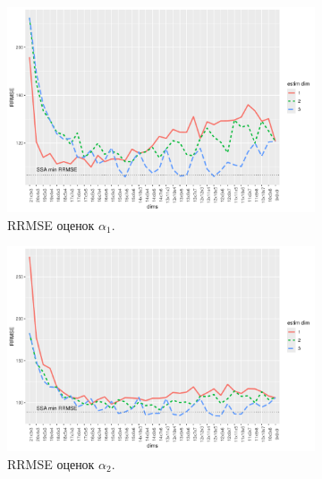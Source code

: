 \documentclass[specialist,
  substylefile=spbu_report.rtx,
subf,href,colorlinks=true, 12pt]{disser}
\theoremstyle{plain}
\theoremstyle{definition}
\theoremstyle{remark}
\begin{document}
\begin{figure}[!ht]
  \centering
  \begin{subfigure}{0.49\linewidth}
    \includegraphics[width=\linewidth, height=0.167\textheight]{rate1_dims_small_eq_rates.pdf}
    \caption{RRMSE оценок $\alpha_1$.}
    \label{fig:rate1_dims_small_eq_rates}
  \end{subfigure}
  \begin{subfigure}{0.49\linewidth}
    \includegraphics[width=\linewidth, height=0.167\textheight]{rate2_dims_small_eq_rates.pdf}
    \caption{RRMSE оценок $\alpha_2$.}
    \label{fig:rate2_dims_small_eq_rates}
  \end{subfigure}
  \begin{subfigure}{0.49\linewidth}

\end{subfigure}
\end{figure}
\end{document}
